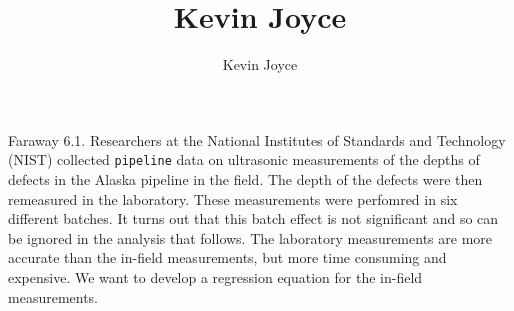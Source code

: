 \documentclass{homework}
\title{Kevin Joyce}
\author{Kevin Joyce}
\begin{document}
 
\newcommand{\figref}[1]{\figurename~\ref{#1}}
\renewcommand{\bar}{\overline}
\renewcommand{\hat}{\widehat}
\renewcommand{\SS}{\mathcal S}
\newcommand{\HH}{\mathscr H}
\newcommand{\mom}{\widetilde}
\newcommand{\mle}{\widehat \Uptheta}
\newcommand{\eps}{\varepsilon}
\newcommand{\todist}{\stackrel{D}\longrightarrow}
\newcommand{\toprob}{\stackrel{p}\longrightarrow}
\newcommand{\TTheta}{\overline{\underline \Theta} }
\newcommand{\del}{\partial}
\newcommand{\approxsim}{\overset{\cdotp}{\underset{\cdotp}{\sim}}}
\newcommand{\RSS}{\ensuremath{\mathrm{RSS}}}
\newcommand{\MSE}{\ensuremath{\mathrm{MSE}}}
\newcommand{\SE}{\ensuremath{\mathrm{SE}}}
\newcommand{\TSS}{\ensuremath{\mathrm{TSS}}}
\newcommand{\SSReg}{\ensuremath{\mathrm{SSReg}}}
\renewcommand{\a}[1]{{\color{red} \it #1}}

\begin{longproblem}
Faraway 6.1. Researchers at the National Institutes of Standards and Technology (NIST) collected \texttt{pipeline} data on ultrasonic measurements of the depths of defects in the Alaska pipeline in the field.  The depth of the defects were then remeasured in the laboratory. These measurements were perfomred in six different batches.  It turns out that this batch effect is not significant and so can be ignored in the analysis that follows.  The laboratory measurements are more accurate than the in-field measurements, but more time consuming and expensive.  We want to develop a regression equation for the in-field measurements.  



\end{longproblem}
\end{document}
